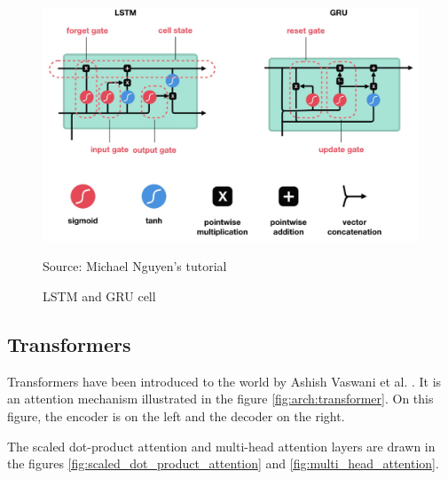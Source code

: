\documentclass[12pt]{report}
\begin{document}
\begin{figure}[htbp]
    \centering
    \includegraphics[width=\textwidth]{images/nn/layers/lstm-gru.jpg}
    \caption{LSTM and GRU cell}
    Source: Michael Nguyen's tutorial \cite{nguyen_illustrated_2019}
    \label{fig:lstm-gru}
\end{figure}


\subsection{Transformers}
\label{sec:back:transformers}

Transformers \cite{vaswani_attention_2017, noauthor_transformer_nodate, giacaglia_transformers_2019, allard_what_2020, alammar_illustrated_nodate} have been introduced to the world by Ashish Vaswani et al. \cite{vaswani_attention_2017-1}.
It is an attention mechanism illustrated in the figure \ref{fig:arch:transformer}.
On this figure, the encoder is on the left and the decoder on the right.

The scaled dot-product attention and multi-head attention layers are drawn in the figures \ref{fig:scaled_dot_product_attention} and \ref{fig:multi_head_attention}.
\end{document}
